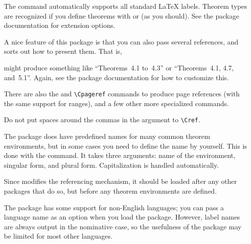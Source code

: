 The command automatically supports all standard \LaTeX{} labels.
Theorem types are recognized if you define theorems with
 or  (as you should).
See the package documentation for extension options.

A nice feature of this package is that you can also pass several references,
and  sorts out how to present them.
That is,
\begin{ExampleCode}
\end{ExampleCode}
might produce something like ``Theorems~4.1 to~4.3''
or ``Theorems~4.1, 4.7, and~5.1''.
Again, see the package documentation for how to customize this.

There are also the  and \verb|\Cpageref|
commands to produce page references (with the same support for ranges),
and a few other more specialized commands.

\begin{gotcha}
Do not put spaces around the commas in the argument to \verb|\Cref|.
\end{gotcha}


The package does have predefined names for many common theorem environments,
but in some cases you need to define the name by yourself.
This is done with the  command.
It takes three arguments: name of the environment, singular form, and plural form.
Capitalization is handled automatically.
%
\begin{ExampleCode}
\newtheorem{assumption}{Assumption}
\end{ExampleCode}



\begin{gotcha}
Since  modifies the referencing mechanism,
it should be loaded after any other packages that do so,
but before any theorem environments are defined.
\end{gotcha}

\begin{gotcha}
The  package has some support for non-English languages;
you can pass a language name as an option when you load the package.
However, label names are always output in the nominative case,
so the usefulness of the package may be limited for most other languages.
\end{gotcha}



